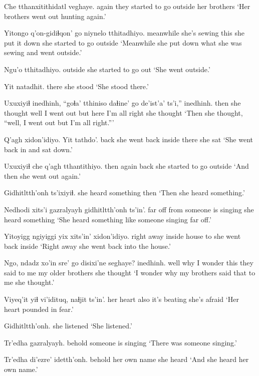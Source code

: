 \documentclass[12pt]{article}
\begin{document}
\gll Che tthanxitithidatl  veghaye.
again {they started to go outside} {her brothers}
\glt `Her brothers went out hunting again.'
\glend

\gll Yitongo q'on-gidiɬqon' go niynelo tthitadhiyo.
meanwhile {she's sewing} this {she put it down} {she started to go outside}
\glt `Meanwhile she put down what she was sewing and went outside.'
\glend

\gll Ngu'o  tthitadhiyo.
outside  {she started to go out}
\glt `She went outside.'
\glend

\gll Yit natadhit.
there {she stood}
\glt `She stood there.'
\glend

\gll Uxuxiyiɬ inedhinh, ``goɬa' tthiniso daɬine'  go de'ist'a' ts'i,'' inedhinh.
then {she thought} well {I went out} but here {I'm all right} {} {she thought}
\glt `Then she thought, ``well, I went out but I'm all right.'''
\glend

\gll Q'agh xidon'idiyo.  Yit tathdo'.
back  {she went back inside}  there {she sat}
\glt `She went back in and sat down.'
\glend

\gll Uxuxiyiɬ che q'agh tthantithiyo.
then  again back {she started to go outside}
\glt `And then she went out again.'
\glend

\gll Gidhitltth'onh ts'ixiyiɬ. 
{she heard something} then  
\glt `Then she heard something.'
\glend

\gll Nedhodi xits'i gazralyayh  gidhitltth'onh ts'in'.
{far off}  from {someone is singing} {she heard something}
\glt `She heard something like someone singing far off.'
\glend

\gll Yitoyigg ngiyiggi yix xits'in' xidon'idiyo.
{right away} inside  house to  {she went back inside}
\glt `Right away she went back into the house.'
\glend

\gll Ngo, {ndadz xo'in} sre'  go disixi'ne  seghaye? inedhinh.
well why  {I wonder} this {they said to me} {my older brothers} {she thought}
\glt `I wonder why my brothers said that to me she thought.'
\glend

\gll Viyeq'it yiɬ vi'idituq, naɬjit ts'in'.
{her heart} also {it's beating} {she's afraid} {}
\glt `Her heart pounded in fear.'
\glend

\gll Gidhitltth'onh.
{{she listened}}
\glt `She listened.'
\glend

\gll Tr'edha gazralyayh.
behold {someone is singing}
\glt `There was someone singing.'
\glend

\gll Tr'edha di'ezre'  idetth'onh.
behold {her own name} {she heard}
\glt `And she heard her own name.'
\glend
\end{document}
